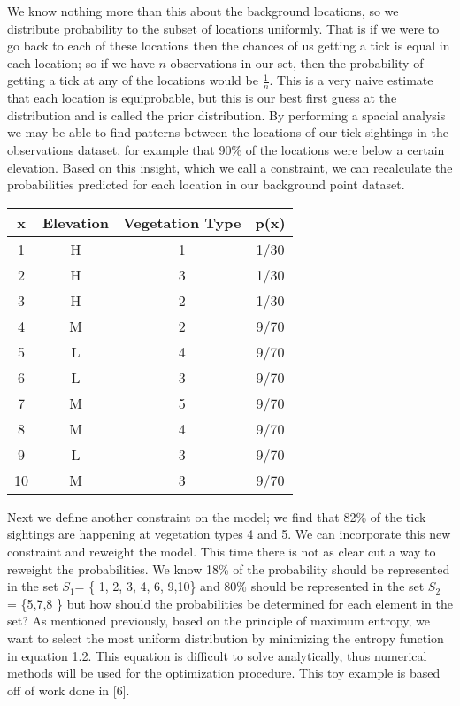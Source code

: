 \noindent We know nothing more than this about the background locations, so we distribute probability to the subset of locations uniformly. That is if we were to go back to each of these locations then the chances of us getting a tick is equal in each location; so if we have $n$ observations in our set, then the probability of getting a tick at any of the locations would be $\frac{1}{n}$. This is a very naive estimate that each location is equiprobable, but this is our best first guess at the distribution and is called the prior distribution. By performing a spacial analysis we may be able to find patterns between the locations of our tick sightings in the observations dataset, for example that 90\% of the locations were below a certain elevation. Based on this insight, which we call a constraint, we can recalculate the probabilities predicted for each location in our background point dataset. \newline

\begin{center}
 \begin{tabular}{||c c c c||} 
 \hline
 x & Elevation & Vegetation Type & p(x) \\ [0.5ex] 
 \hline\hline
 1 & H &  1& 1/30 \\ 
 \hline
  2 & H & 3 &  1/30\\
 \hline
   3 & H & 2 &  1/30\\
 \hline
 4 & M & 2 & 9/70  \\
 \hline
  5 & L & 4 & 9/70  \\
 \hline
   6 & L & 3 & 9/70 \\
 \hline
  7 & M & 5 & 9/70 \\
 \hline
   8 & M & 4 &  9/70 \\
 \hline
 9 & L & 3 & 9/70 \\
 \hline
   10 & M & 3 & 9/70\\
 \hline
\end{tabular}
\end{center}

\noindent Next we define another constraint on the model; we find that 82\% of the tick sightings are happening at vegetation types 4 and 5. We can incorporate this new constraint and reweight the model. This time there is not as clear cut a way to reweight the probabilities. We know 18\% of the probability should be represented in the set $S_1$= \{ 1, 2, 3, 4, 6, 9,10\} and 80\% should be represented in the set $S_2$ = \{5,7,8 \} but how should the probabilities be determined for each element in the set? As mentioned previously, based on the principle of maximum entropy, we want to select the most uniform distribution by minimizing the entropy function in equation 1.2. This equation is difficult to solve analytically, thus numerical methods will be used for the optimization procedure. This toy example is based off of work done in [6]. \newline

